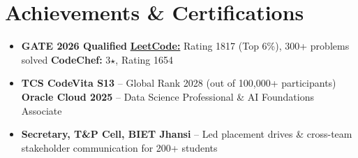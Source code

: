 \documentclass[10pt,letterpaper]{article}
\begin{document}
\section{Achievements \& Certifications}
\begin{itemize}
  \item \textbf{GATE 2026 Qualified} \quad
        \href{https://leetcode.com/u/lakshaypahwa/}{\textbf{LeetCode:}} Rating 1817 (Top 6\%), 300+ problems solved \quad
        \textbf{CodeChef:} 3$\star$, Rating 1654
  \item \textbf{TCS CodeVita S13} -- Global Rank 2028 (out of 100,000+ participants) \quad
        \textbf{Oracle Cloud 2025} -- Data Science Professional \& AI Foundations Associate
  \item \textbf{Secretary, T\&P Cell, BIET Jhansi} -- Led placement drives \& cross-team stakeholder communication for 200+ students
\end{itemize}
\end{document}
